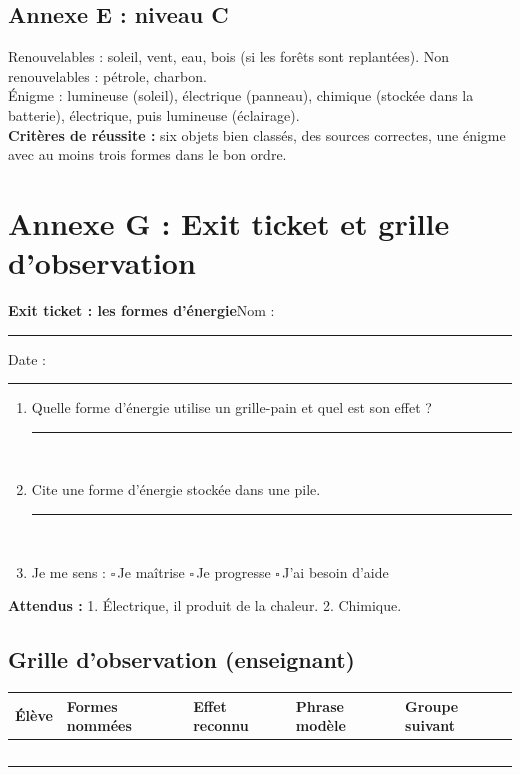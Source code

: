 \documentclass[11pt,a4paper]{article}
\newcommand{\cb}{$\square$\,}
\newcommand{\lig}{\noindent\rule{\linewidth}{0.3pt}\\[5mm]}
\newcommand{\entete}[2]{%
  \begin{tcolorbox}[colback=#1!10,colframe=#1!70!black,boxrule=0.8pt,arc=2mm]
  {\Large\bfseries #2}\hfill Nom : \rule{4cm}{0.3pt}\quad Date : \rule{2.2cm}{0.3pt}
  \end{tcolorbox}}
\begin{document}
\subsection*{Annexe E : niveau C}
Renouvelables : soleil, vent, eau, bois (si les forêts sont replantées). Non renouvelables : pétrole, charbon.\\
Énigme : lumineuse (soleil), électrique (panneau), chimique (stockée dans la batterie), électrique, puis lumineuse (éclairage).\\
\textbf{Critères de réussite :} six objets bien classés, des sources correctes, une énigme avec au moins trois formes dans le bon ordre.

\newpage
\section*{Annexe G : Exit ticket et grille d'observation}
\entete{gray}{Exit ticket : les formes d'énergie}

\begin{enumerate}
 \item Quelle forme d'énergie utilise un grille-pain et quel est son effet ?\\ \lig
 \item Cite une forme d'énergie stockée dans une pile.\\ \lig
 \item Je me sens : \cb Je maîtrise \quad \cb Je progresse \quad \cb J'ai besoin d'aide
\end{enumerate}

\textbf{Attendus :} 1. Électrique, il produit de la chaleur. 2. Chimique.

\bigskip
\subsection*{Grille d'observation (enseignant)}
\begin{tabularx}{\linewidth}{Y p{2.4cm} p{2.4cm} p{2.4cm} Y}
\toprule
Élève & Formes nommées & Effet reconnu & Phrase modèle & Groupe suivant\\
\midrule
 & & & & \\ & & & & \\ & & & & \\ & & & & \\ & & & & \\
\bottomrule
\end{tabularx}
\end{document}
